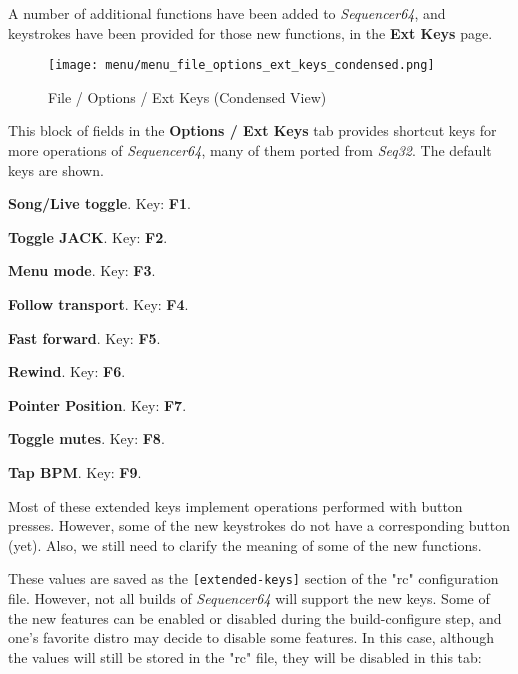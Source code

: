    A number of additional functions have been added to \textsl{Sequencer64},
   and keystrokes have been provided for those new functions, in the
   \textbf{Ext Keys} page.

\begin{figure}[H]
   \centering 
   \texttt{[image: menu/menu\_file\_options\_ext\_keys\_condensed.png]}
   \caption{File / Options / Ext Keys (Condensed View)}
   \label{fig:seq64_menu_file_options_ext_keys}
\end{figure}


   This block of fields in the \textbf{Options / Ext Keys} tab
   provides shortcut keys for more operations of \textsl{Sequencer64}, many of
   them ported from \textsl{Seq32}.
   The default keys are shown.

   \begin{enumber}
      \item \textbf{Song/Live toggle}.
         Key:  \textbf{F1}.
      \item \textbf{Toggle JACK}.
         Key:  \textbf{F2}.
      \item \textbf{Menu mode}.
         Key:  \textbf{F3}.
      \item \textbf{Follow transport}.
         Key:  \textbf{F4}.
      \item \textbf{Fast forward}.
         Key:  \textbf{F5}.
      \item \textbf{Rewind}.
         Key:  \textbf{F6}.
      \item \textbf{Pointer Position}.
         Key:  \textbf{F7}.
      \item \textbf{Toggle mutes}.
         Key:  \textbf{F8}.
      \item \textbf{Tap BPM}.
         Key:  \textbf{F9}.
   \end{enumber}

   Most of these extended keys implement operations performed with button
   presses.  However, some of the new keystrokes do not have a corresponding
   button (yet).  Also, we still need to clarify the meaning of some of the new
   functions.

   These values are saved as the \texttt{[extended-keys]} section of the "rc"
   configuration file.  However, not all builds of \textsl{Sequencer64} will
   support the new keys.  Some of the new features can be enabled or disabled
   during the build-configure step, and one's favorite distro may decide to
   disable some features.  In this case, although the values will still be
   stored in the "rc" file, they will be disabled in this tab:

